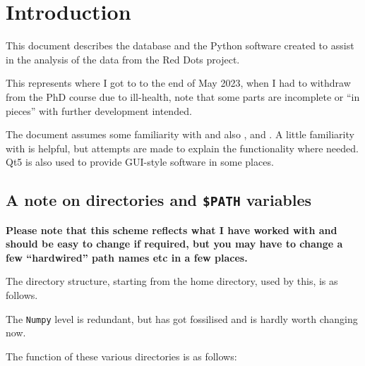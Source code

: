 \section{Introduction}
\protect\label{section:intro}

This document describes the database and the Python software created to assist
in the analysis of the data from the Red Dots project.

This represents where I got to to the end of May 2023, when I had to withdraw
from the PhD course due to ill-health, note that some parts are incomplete or
``in pieces'' with further development intended.

The document assumes some familiarity with {\py} and also \numpy, {\scipy} and
\mpl. A little familiarity with {\mysql} is helpful, but attempts are made to
explain the functionality where needed. Qt5 is also used to provide GUI-style
software in some places.

\subsection{A note on directories and \texttt{\$PATH} variables}
\protect\label{section:pathvars}

\textbf{Please note that this scheme reflects what I have worked with and
should be easy to change if required, but you may have to change a few
``hardwired'' path names etc in a few places.}

The directory structure, starting from the home directory, used by this, is as
follows.
\vspace{10pt}

The \texttt{Numpy} level is redundant, but has got fossilised and is hardly worth
changing now.

The function of these various directories is as follows:

